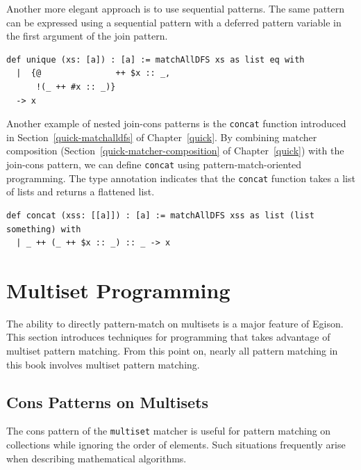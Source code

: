 Another more elegant approach is to use sequential patterns.
The same pattern can be expressed using a sequential pattern with a deferred pattern variable in the first argument of the join pattern.
\begin{lstlisting}[language=egison,numbers=none]
def unique (xs: [a]) : [a] := matchAllDFS xs as list eq with
  |  {@               ++ $x :: _,
      !(_ ++ #x :: _)}
  -> x
\end{lstlisting}

Another example of nested join-cons patterns is the \lstinline{concat} function introduced in Section~\ref{quick-matchalldfs} of Chapter~\ref{quick}.
By combining matcher composition (Section~\ref{quick-matcher-composition} of Chapter~\ref{quick}) with the join-cons pattern, we can define \lstinline{concat} using pattern-match-oriented programming.
The type annotation indicates that the \lstinline{concat} function takes a list of lists and returns a flattened list.
\begin{lstlisting}[language=egison,numbers=none]
def concat (xss: [[a]]) : [a] := matchAllDFS xss as list (list something) with
  | _ ++ (_ ++ $x :: _) :: _ -> x
\end{lstlisting}


\section{Multiset Programming}

The ability to directly pattern-match on multisets is a major feature of Egison.
This section introduces techniques for programming that takes advantage of multiset pattern matching.
From this point on, nearly all pattern matching in this book involves multiset pattern matching.

\subsection{Cons Patterns on Multisets}

The cons pattern of the \lstinline{multiset} matcher is useful for pattern matching on collections while ignoring the order of elements.
Such situations frequently arise when describing mathematical algorithms.

